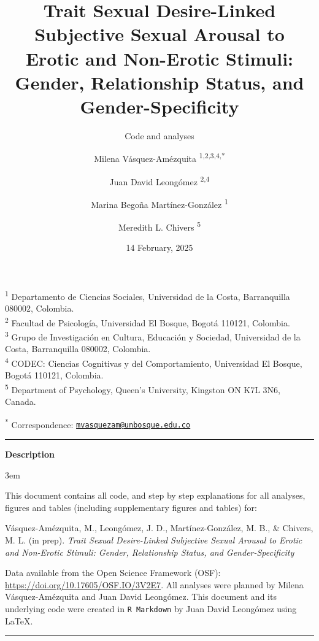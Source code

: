 \documentclass[
  bookmarksnumbered]{article}
\title{Trait Sexual Desire-Linked Subjective Sexual Arousal to Erotic and Non-Erotic Stimuli: Gender, Relationship Status, and Gender-Specificity}
\subtitle{Code and analyses}
\author{Milena Vásquez-Amézquita \orcidlink{0000-0001-7317-8430}\textsuperscript{1,2,3,4,*} \and Juan David Leongómez \orcidlink{0000-0002-0092-6298}\textsuperscript{2,4} \and Marina Begoña Martínez-González \orcidlink{0000-0002-5840-6383}\textsuperscript{1} \and Meredith L. Chivers \orcidlink{0000-0002-5495-9263}\textsuperscript{5}}
\date{14 February, 2025}
\begin{document}
\maketitle

\textsuperscript{1} Departamento de Ciencias Sociales, Universidad de la Costa, Barranquilla 080002, Colombia.\\
\textsuperscript{2} Facultad de Psicología, Universidad El Bosque, Bogotá 110121, Colombia.\\
\textsuperscript{3} Grupo de Investigación en Cultura, Educación y Sociedad, Universidad de la Costa, Barranquilla 080002, Colombia.\\
\textsuperscript{4} CODEC: Ciencias Cognitivas y del Comportamiento, Universidad El Bosque, Bogotá 110121, Colombia.\\
\textsuperscript{5} Department of Psychology, Queen's University, Kingston ON K7L 3N6, Canada.

\textsuperscript{*} Correspondence: \href{mailto:mvasquezam@unbosque.edu.co}{\href{mailto:mvasquezam@unbosque.edu.co}{\nolinkurl{mvasquezam@unbosque.edu.co}}}

\begin{center}\rule{0.5\linewidth}{0.5pt}\end{center}

\begin{center}
\textbf{Description}
\end{center}

\par
\begingroup
\leftskip3em
\rightskip\leftskip

This document contains all code, and step by step explanations for all analyses, figures and tables (including supplementary figures and tables) for:

\begin{hangparas}{.25in}{1}
Vásquez-Amézquita, M., Leongómez, J. D., Martínez-González, M. B., \& Chivers, M. L. (in prep). \textit{Trait Sexual Desire-Linked Subjective Sexual Arousal to Erotic and Non-Erotic Stimuli: Gender, Relationship Status, and Gender-Specificity}
\end{hangparas}

Data available from the Open Science Framework (OSF): \url{https://doi.org/10.17605/OSF.IO/3V2E7}. All analyses were planned by Milena Vásquez-Amézquita and Juan David Leongómez. This document and its underlying code were created in \texttt{R\ Markdown} by Juan David Leongómez using \LaTeX.

\begin{center}\rule{0.5\linewidth}{0.5pt}\end{center}
\end{document}
